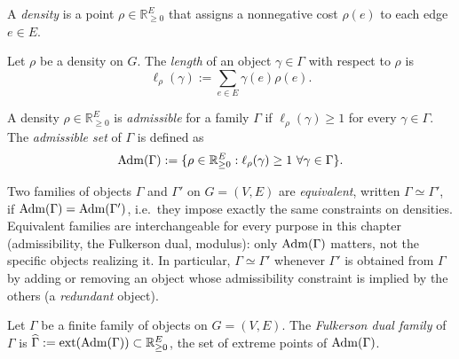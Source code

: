 \begin{definition}[Density]
\label{def:density}
\leanok
A \emph{density} is a point $\rho \in \mathbb R_{\ge 0}^E$ that assigns a
nonnegative cost $\rho(e)$ to each edge $e \in E$.
\end{definition}

\begin{definition}
\label{def:length}
\leanok
Let $\rho$ be a density on $G$. The \emph{length} of an object $\gamma \in
\Gamma$ with respect to $\rho$ is
\[
  \ell_\rho(\gamma) := \sum_{e \in E} \gamma(e) \rho(e).
\]
\end{definition}

\begin{definition}
\label{def:admissible-density}
\leanok
A density $\rho \in \mathbb R_{\ge 0}^E$ is \emph{admissible} for a family
$\Gamma$ if $\ell_\rho(\gamma) \ge 1$ for every $\gamma \in \Gamma$. The
\emph{admissible set} of $\Gamma$ is defined as
\[
  \operatorname{Adm}(\Gamma) := \{\rho \in \mathbb R_{\ge 0}^E : \ell_\rho(\gamma) \ge 1 \ \forall \gamma \in \Gamma\}.
\]
\end{definition}

\begin{definition}
\label{def:family-equivalent}
\leanok
Two families of objects $\Gamma$ and $\Gamma'$ on $G = (V, E)$ are
\emph{equivalent}, written $\Gamma \simeq \Gamma'$, if $\operatorname{Adm}(\Gamma) =
\operatorname{Adm}(\Gamma')$, i.e.\ they impose exactly the same constraints on densities.
Equivalent families are interchangeable for every purpose in this chapter
(admissibility, the Fulkerson dual, modulus): only $\operatorname{Adm}(\Gamma)$ matters, not
the specific objects realizing it. In particular, $\Gamma \simeq \Gamma'$
whenever $\Gamma'$ is obtained from $\Gamma$ by adding or removing an object
whose admissibility constraint is implied by the others (a \emph{redundant}
object).
\end{definition}

\begin{definition}
\label{def:fulkerson-dual}
\leanok
Let $\Gamma$ be a finite family of objects on $G = (V, E)$.
The \emph{Fulkerson dual family} of $\Gamma$ is $\widehat\Gamma :=
\operatorname{ext}(\operatorname{Adm}(\Gamma)) \subset \mathbb R_{\ge 0}^E$, the set of
extreme points of $\operatorname{Adm}(\Gamma)$.
\end{definition}

